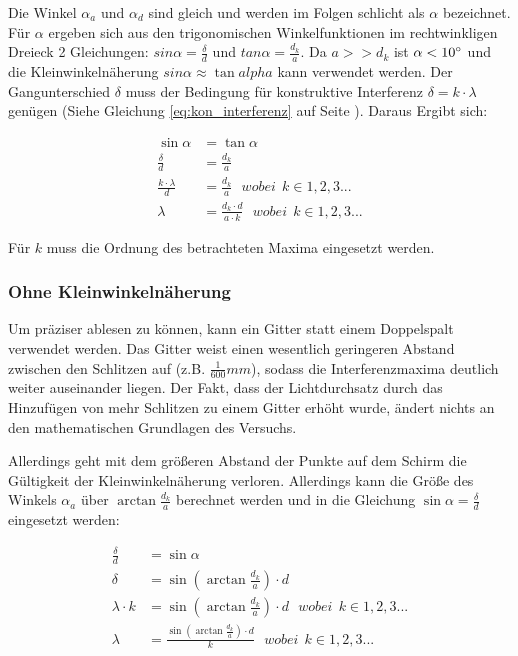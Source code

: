 	Die Winkel $\alpha_a$ und $\alpha_d$ sind gleich und werden im Folgen schlicht als $\alpha$ bezeichnet. Für $\alpha$ ergeben sich aus den trigonomischen Winkelfunktionen im rechtwinkligen Dreieck 2 Gleichungen: $sin{\alpha}=\frac{\delta}{d}$ und $tan{\alpha}=\frac{d_k}{a}$. Da $a>>d_k$ ist $\alpha<10 \degree$ und die Kleinwinkelnäherung $sin{\alpha} \approx \tan{alpha}$ kann verwendet werden. Der Gangunterschied $\delta$ muss der Bedingung für konstruktive Interferenz $\delta = k \cdot \lambda$ genügen (Siehe Gleichung \ref{eq:kon_interferenz} auf Seite \pageref{eq:kon_interferenz}). Daraus Ergibt sich:
	
	\begin{align}
		\sin{\alpha} &= \tan{\alpha} \\
		\frac{\delta}{d} &= \frac{d_k}{a} \\
		\frac{k \cdot \lambda}{d} &= \frac{d_k}{a}  \ \ \ wobei \ \ k \in 1,2,3... \\
		\lambda &= \frac{d_{k} \cdot d}{a \cdot k}  \ \ \ wobei \ \ k \in 1,2,3...
	\end{align}
	
	Für $k$ muss die Ordnung des betrachteten Maxima eingesetzt werden.
		

\subsubsection{Ohne Kleinwinkelnäherung}

	Um präziser ablesen zu können, kann ein Gitter statt einem Doppelspalt verwendet werden. Das Gitter weist einen wesentlich geringeren Abstand zwischen den Schlitzen auf (z.B. $\frac{1}{600}mm$), sodass die Interferenzmaxima deutlich weiter auseinander liegen. Der Fakt, dass der Lichtdurchsatz durch das Hinzufügen von mehr Schlitzen zu einem Gitter erhöht wurde, ändert nichts an den mathematischen Grundlagen des Versuchs.
	
	Allerdings geht mit dem größeren Abstand der Punkte auf dem Schirm die Gültigkeit der Kleinwinkelnäherung verloren. Allerdings kann die Größe des Winkels $\alpha_a$ über $\arctan{\frac{d_k}{a}}$ berechnet werden und in die Gleichung $\sin{\alpha} = \frac{\delta}{d}$ eingesetzt werden:
	
	\begin{align}
		\frac{\delta}{d} &= \sin{\alpha} \\
		 \delta &= \sin{(\arctan{\frac{d_k}{a}})} \cdot d \\
		\lambda \cdot k &= \sin{(\arctan{\frac{d_k}{a}})} \cdot d \ \ \ wobei \ \ k \in 1,2,3... \\
		\lambda &= \frac{\sin{(\arctan{\frac{d_k}{a}})} \cdot d}{k} \ \ \ wobei \ \ k \in 1,2,3...
	\end{align}


